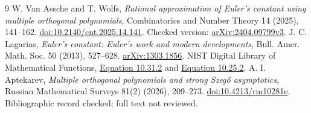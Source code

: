 \documentclass[11pt]{article}
\begin{document}
\begin{thebibliography}{9}
 W. Van Assche and T. Wolfs, \emph{Rational approximation of Euler's constant using multiple orthogonal polynomials}, Combinatorics and Number Theory 14 (2025), 141--162. \href{https://doi.org/10.2140/cnt.2025.14.141}{doi:10.2140/cnt.2025.14.141}. Checked version: \href{https://arxiv.org/html/2404.09799v3}{arXiv:2404.09799v3}.
 J. C. Lagarias, \emph{Euler's constant: Euler's work and modern developments}, Bull. Amer. Math. Soc. 50 (2013), 527--628. \href{https://arxiv.org/abs/1303.1856}{arXiv:1303.1856}.
 NIST Digital Library of Mathematical Functions, \href{https://dlmf.nist.gov/10.31#E2}{Equation 10.31.2} and \href{https://dlmf.nist.gov/10.25#E2}{Equation 10.25.2}.
 A. I. Aptekarev, \emph{Multiple orthogonal polynomials and strong Szeg\H{o} asymptotics}, Russian Mathematical Surveys 81(2) (2026), 209--273. \href{https://www.mathnet.ru/eng/rm10281}{doi:10.4213/rm10281e}. Bibliographic record checked; full text not reviewed.
\end{thebibliography}
\end{document}
